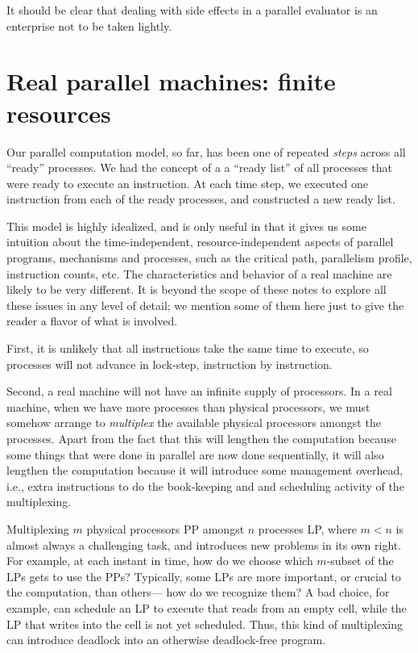 It should be clear that dealing with side effects in a parallel
evaluator is an enterprise not to be taken lightly.


\section{Real parallel machines: finite resources}

Our parallel computation model, so far, has been one of repeated {\em
steps\/} across all ``ready'' processes.  We had the concept of a a
``ready list'' of all processes that were ready to execute an
instruction.  At each time step, we executed one instruction from each
of the ready processes, and constructed a new ready list.

This model is highly idealized, and is only useful in that it gives us some
intuition about the time-independent, resource-independent aspects of
parallel programs, mechanisms and processes, such as the critical path,
parallelism profile, instruction counts, etc.  The characteristics and
behavior of a real machine are likely to be very different.  It is beyond the
scope of these notes to explore all these issues in any level of detail; we
mention some of them here just to give the reader a flavor of what is
involved.

First, it is unlikely that all instructions take the same time to
execute, so processes will not advance in lock-step, instruction by
instruction.

Second, a real machine will not have an infinite supply of processors.
In a real machine, when we have more processes than physical
processors, we must somehow arrange to {\em multiplex\/} the available
physical processors amongst the processes.  Apart from the fact that
this will lengthen the computation because some things that were done
in parallel are now done sequentially, it will also lengthen the
computation because it will introduce some management overhead, i.e.,
extra instructions to do the book-keeping and and scheduling activity
of the multiplexing.

Multiplexing $m$ physical processors PP amongst $n$ processes LP,
where $m<n$ is almost always a challenging task, and introduces new problems
in its own right.  For example, at each instant in time, how do we choose
which $m$-subset of the LPs gets to use the PPs?  Typically, some LPs are
more important, or crucial to the computation, than others--- how do we
recognize them?  A bad choice, for example, can schedule an LP to execute
that reads from an empty cell, while the LP that writes into the cell is not
yet scheduled.  Thus, this kind of multiplexing can introduce deadlock into
an otherwise deadlock-free program.

